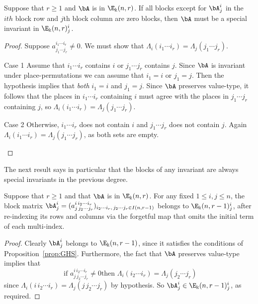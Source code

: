 \begin{lemm}\label{lem:special-criterion}
 Suppose that $r\ge 1$ and $\bA$ is in $\E_\Bbbk(n,r)$. If all blocks
 except for $\bA^i_j$ in the $ith$ block row and $j$th block column
 are zero blocks, then $\bA$ must be a special invariant in
 $\E_\Bbbk(n,r)^i_j$.
\end{lemm}

\begin{proof}
Suppose $a^{i_1 \cdots i_r}_{j_1\cdots j_r} \ne 0$. We must show
that $\Lambda_i(i_1 \cdots i_r) = \Lambda_j(j_1 \cdots j_r)$.

\begin{enonce*}[remark]{\hypertarget{lemma4.2C1}{Case 1}} Assume that $i_1 \cdots i_r$ contains $i$ or $j_1
\cdots j_r$ contains $j$. Since $\bA$ is invariant under
place-permutations we can assume that $i_1=i$ or $j_1=j$. Then the
hypothesis implies that \emph{both} $i_1=i$ and $j_1=j$. Since $\bA$
preserves value-type, it follows that the places in $i_1 \cdots i_r$
containing $i$ must agree with the places in $j_1 \cdots j_r$
containing $j$, so $\Lambda_i(i_1 \cdots i_r) = \Lambda_j(j_1 \cdots
j_r)$.
\end{enonce*}

\begin{enonce*}[remark]{\hypertarget{lemma4.2C2}{Case 2}} Otherwise, $i_1 \cdots i_r$ does not contain $i$ and
$j_1 \cdots j_r$ does not contain $j$. Again $\Lambda_i(i_1 \cdots
i_r) = \Lambda_j(j_1 \cdots j_r)$, as both sets are empty.\qedhere
\end{enonce*}
\end{proof}


The next result says in particular that the blocks of any invariant
are always special invariants in the previous degree.

\begin{lemm}\label{lem:blocks-are-special}
 Suppose that $r \ge 1$ and that $\bA$ is in $\E_\Bbbk(n,r)$. For any
 fixed $1 \le i,j \le n$, the block matrix $\bA^i_j = (a^{i\, i_2
 \cdots i_r}_{j\,j_2 \cdots j_r})_{i_2 \cdots i_r,\, j_2 \cdots j_r
 \in I(n,r-1)}$ belongs to $\E_\Bbbk(n,r-1)^i_j$, after re-indexing
 its rows and columns via the forgetful map that omits the initial
 term of each multi-index.
\end{lemm}

\begin{proof}
Clearly $\bA^i_j$ belongs to $\E_\Bbbk(n,r-1)$, since it satisfies the
conditions of Proposition~\ref{prop:GHS}. Furthermore, the fact that
$\bA$ preserves value-type implies that
\[
\text{ if } a^{i\, i_2 \cdots i_r}_{j\,j_2 \cdots j_r} \ne 0 \text{
 then } \Lambda_i(i_2 \cdots i_r) = \Lambda_j(j_2 \cdots j_r)
\]
since $\Lambda_i(i\, i_2 \cdots i_r) = \Lambda_j(j\,j_2 \cdots j_r)$
by hypothesis. So $\bA^i_j \in \E_\Bbbk(n,r-1)^i_j$, as
required.
\end{proof}

